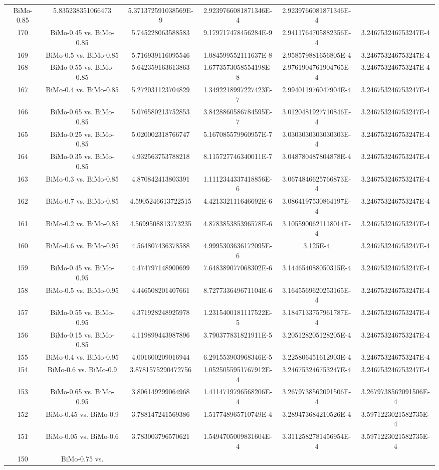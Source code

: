 \documentclass[a4paper,10pt]{article}
\begin{document}
\begin{landscape}
\begin{table}[!htp]
\begin{tabular}{cccccc}
BiMo-0.85&5.835238351066473&5.371372591038569E-9&2.9239766081871346E-4&2.9239766081871346E-4\\170&BiMo-0.45 vs. BiMo-0.85&5.745228063588583&9.179717478456284E-9&2.9411764705882356E-4&3.246753246753247E-4\\169&BiMo-0.5 vs. BiMo-0.85&5.716939116095546&1.084599552111637E-8&2.958579881656805E-4&3.246753246753247E-4\\168&BiMo-0.55 vs. BiMo-0.85&5.642359163613863&1.6773573058554198E-8&2.9761904761904765E-4&3.246753246753247E-4\\167&BiMo-0.4 vs. BiMo-0.85&5.272031123704829&1.3492218997227423E-7&2.994011976047904E-4&3.246753246753247E-4\\166&BiMo-0.65 vs. BiMo-0.85&5.076580213752853&3.8428860586784595E-7&3.0120481927710846E-4&3.246753246753247E-4\\165&BiMo-0.25 vs. BiMo-0.85&5.020002318766747&5.167085579960957E-7&3.0303030303030303E-4&3.246753246753247E-4\\164&BiMo-0.35 vs. BiMo-0.85&4.932563753788218&8.115727746340011E-7&3.048780487804878E-4&3.246753246753247E-4\\163&BiMo-0.3 vs. BiMo-0.85&4.870842413803391&1.1112344337418856E-6&3.0674846625766873E-4&3.246753246753247E-4\\162&BiMo-0.7 vs. BiMo-0.85&4.5905246613722515&4.421332111646692E-6&3.0864197530864197E-4&3.246753246753247E-4\\161&BiMo-0.2 vs. BiMo-0.85&4.5699508813773235&4.878385385396578E-6&3.1055900621118014E-4&3.246753246753247E-4\\160&BiMo-0.6 vs. BiMo-0.95&4.564807436378588&4.9995303636172095E-6&3.125E-4&3.246753246753247E-4\\159&BiMo-0.45 vs. BiMo-0.95&4.474797148900699&7.648389077068302E-6&3.144654088050315E-4&3.246753246753247E-4\\158&BiMo-0.5 vs. BiMo-0.95&4.446508201407661&8.727733649671104E-6&3.1645569620253165E-4&3.246753246753247E-4\\157&BiMo-0.55 vs. BiMo-0.95&4.371928248925978&1.2315400181117522E-5&3.1847133757961787E-4&3.246753246753247E-4\\156&BiMo-0.15 vs. BiMo-0.85&4.119899443987896&3.790377831821911E-5&3.205128205128205E-4&3.246753246753247E-4\\155&BiMo-0.4 vs. BiMo-0.95&4.001600209016944&6.291553903968346E-5&3.225806451612903E-4&3.246753246753247E-4\\154&BiMo-0.6 vs. BiMo-0.9&3.8781575290472756&1.0525055951767912E-4&3.246753246753247E-4&3.246753246753247E-4\\153&BiMo-0.65 vs. BiMo-0.95&3.806149299064968&1.4114719796568206E-4&3.2679738562091506E-4&3.2679738562091506E-4\\152&BiMo-0.45 vs. BiMo-0.9&3.788147241569386&1.517748965710749E-4&3.289473684210526E-4&3.5971223021582735E-4\\151&BiMo-0.05 vs. BiMo-0.6&3.783003796570621&1.5494705009831604E-4&3.3112582781456954E-4&3.5971223021582735E-4\\150&BiMo-0.75 vs. 
\end{tabular}
\end{table}
\end{landscape}
\end{document}
